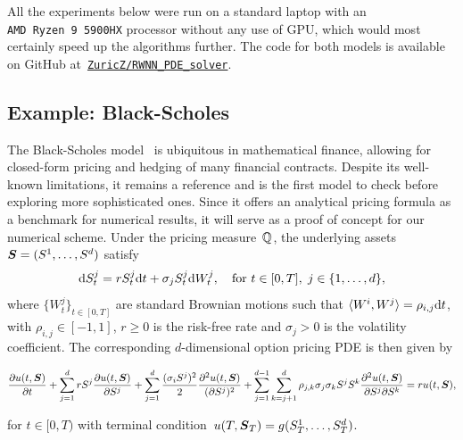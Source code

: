 \sloppy All the experiments below were run on a standard laptop with an \texttt{AMD~Ryzen~9~5900HX} processor without any use of GPU, which would most certainly speed up the algorithms further. The code for both models is available on GitHub at~\href{https://github.com/ZuricZ/RWNN_PDE_solver}{\texttt{ZuricZ/RWNN\_PDE\_solver}}.


\subsection{Example: Black-Scholes}
The Black-Scholes model~\cite{Black1973TheLiabilities} is ubiquitous in mathematical finance, allowing for closed-form pricing and hedging of many financial contracts.
Despite its well-known limitations, it remains a reference and is the first model to check before exploring more sophisticated ones. 
Since it offers an analytical pricing formula as a benchmark for numerical results, it will serve as a proof of concept for our numerical scheme.
Under the pricing measure~$\mathbb{Q}$, the underlying assets $\boldsymbol{S} = (S^1,\ldots, S^d)$ satisfy
\begin{equation}
    \mathrm{d} S^j_t = r S^j_t \mathrm{d} t + \sigma_j S^j_t \mathrm{d} W^j_t, \quad \text{for } t\in[0,T],\; j\in\{1,\dots,d\},
\end{equation}
where $\{W^j_t\}_{t\in[0,T]}$ are standard Brownian motions such that $\langle W^i, W^j \rangle = \rho_{i,j}\mathrm{d} t$, 
with $\rho_{i,j}\in [-1,1]$, $r\geq 0$ is the risk-free rate and $\sigma_j>0$ is the volatility coefficient. 
The corresponding $d$-dimensional option pricing PDE is then given by
\begin{small}
\begin{equation*}
\frac{\partial u(t,\boldsymbol{S})}{\partial t}+\sum_{j=1}^d r S^j \frac{\partial u(t,\boldsymbol{S})}{\partial S^j} + \sum_{j=1}^d \frac{(\sigma_i S^j)^2}{2} \frac{\partial^2 u(t,\boldsymbol{S})}{(\partial S^j)^2} + \sum_{j=1}^{d-1} \sum_{k=j+1}^d \rho_{j, k} \sigma_j \sigma_k S^j S^k \frac{\partial^2 u(t,\boldsymbol{S})}{\partial S^j \partial S^k} = r u(t,\boldsymbol{S}),
\end{equation*}
\end{small}
for $t\in[0,T)$ with terminal condition~$u(T,\boldsymbol{S}_T) = g(S^1_T,\dots, S^d_T)$.

